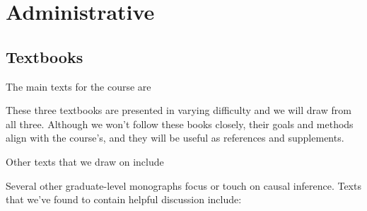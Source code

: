 \documentclass[12pt]{article}
\begin{document}
\section*{Administrative}

\subsection*{Textbooks}

The main texts for the course are

\begin{verse}  \end{verse}

\begin{verse}  \end{verse}

\begin{verse}  \end{verse}

These three textbooks are presented in varying difficulty and we will draw from all three. Although we won't follow these books closely, their goals and methods align with the course's, and they will be useful as references and supplements. %

Other texts that we draw on include
\begin{verse}   \end{verse}

\begin{verse}  \end{verse}


Several other graduate-level monographs focus or touch
on causal inference.  Texts that we've found to contain helpful
discussion include:

\begin{verse}








\end{verse}
\end{document}

